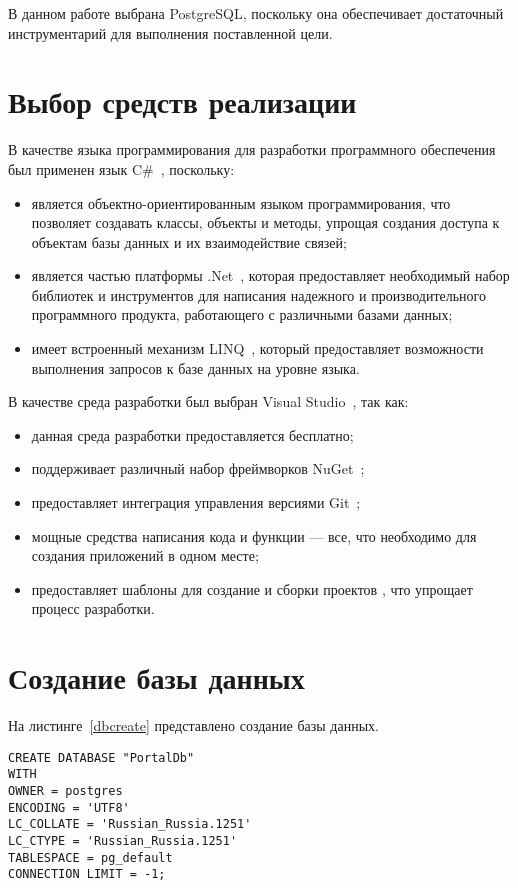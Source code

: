 В данном работе выбрана PostgreSQL, поскольку она обеспечивает достаточный инструментарий для выполнения поставленной цели.

\section{Выбор средств реализации}

В качестве языка программирования для разработки программного обеспечения был применен язык C\#~\cite{csharp}, поскольку:
\begin{itemize}
	\item является объектно-ориентированным языком программирования, что позволяет создавать классы, объекты и методы, упрощая создания доступа к объектам базы данных и их взаимодействие связей;
	\item является частью платформы .Net~\cite{dotnet}, которая предоставляет необходимый набор библиотек и инструментов  для написания надежного и производительного программного продукта, работающего с различными базами данных;
	\item имеет встроенный механизм LINQ~\cite{linq}, который предоставляет возможности выполнения запросов к базе данных на уровне языка.
\end{itemize}

В качестве среда разработки был выбран Visual Studio~\cite{visualstudio}, так как:
\begin{itemize}
	\item данная среда разработки предоставляется бесплатно;
	\item поддерживает различный набор фреймворков NuGet~\cite{nuget};
	\item предоставляет интеграция управления версиями Git~\cite{git};
	\item мощные средства написания кода и функции --- все, что необходимо для создания приложений в одном месте;
	\item предоставляет шаблоны для создание и сборки проектов , что упрощает процесс разработки.
\end{itemize}

\section{Создание базы данных}

На листинге~\ref{dbcreate} представлено создание базы данных.

\begin{center}
	\begin{lstlisting}[label=dbcreate, caption=Создание базы данных]
CREATE DATABASE "PortalDb"
WITH
OWNER = postgres
ENCODING = 'UTF8'
LC_COLLATE = 'Russian_Russia.1251'
LC_CTYPE = 'Russian_Russia.1251'
TABLESPACE = pg_default
CONNECTION LIMIT = -1;
	\end{lstlisting}
\end{center}

